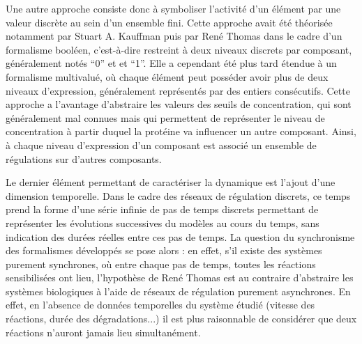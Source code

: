 Une autre approche consiste donc à symboliser l'activité d'un élément par
une valeur discrète au sein d'un ensemble fini.
Cette approche avait été théorisée notamment par Stuart A. Kauffman puis par René Thomas
\cite{kauffman69,Thomas73}
dans le cadre d'un formalisme booléen,
c'est-à-dire restreint à deux niveaux discrets par composant, généralement notés “0” et et “1”.
Elle a cependant été plus tard étendue à un formalisme multivalué,
où chaque élément peut posséder avoir plus de deux niveaux d'expression,
généralement représentés par des entiers consécutifs.
Cette approche a l'avantage d'abstraire les valeurs des seuils de concentration,
qui sont généralement mal connues
mais qui permettent de représenter le niveau de concentration
à partir duquel la protéine va influencer un autre composant.
Ainsi, à chaque niveau d'expression d'un composant est associé un ensemble de régulations
sur d'autres composants.

Le dernier élément permettant de caractériser la dynamique est l'ajout d'une
dimension temporelle.
Dans le cadre des réseaux de régulation discrets, ce temps prend la forme d'une série
infinie de pas de temps discrets permettant de représenter les évolutions
successives du modèles au cours du temps, sans indication des durées réelles
entre ces pas de temps.
La question du synchronisme des formalismes développés se pose alors :
en effet, s'il existe des systèmes purement synchrones, où entre chaque pas de temps,
toutes les réactions sensibilisées ont lieu,
l'hypothèse de René Thomas \cite{Thomas73}
est au contraire d'abstraire les systèmes biologiques à l'aide
de réseaux de régulation purement asynchrones.
En effet, en l'absence de données temporelles du système étudié
(vitesse des réactions, durée des dégradations...)
il est plus raisonnable de considérer que deux réactions n'auront jamais lieu simultanément.

